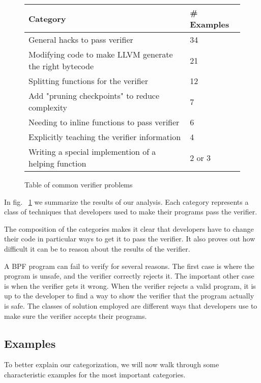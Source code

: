 \begin{figure}
    \centering
    \begin{tabular}{|p{5cm}|p{2cm}|}
        \hline
        Category & \# Examples \\
        \hline
        General hacks to pass verifier & 34 \\
        \hline
        Modifying code to make LLVM generate the right bytecode & 21 \\
        \hline
        Splitting functions for the verifier & 12 \\
        \hline
        Add "pruning checkpoints" to reduce complexity & 7 \\
        \hline
        Needing to inline functions to pass verifier & 6 \\
        \hline
        Explicitly teaching the verifier information & 4 \\
        \hline
        Writing a special implemention of a helping function & 2 or 3 \\
        \hline
    \end{tabular}
    \caption{Table of common verifier problems}
    \label{fig:commit-table}
\end{figure}

In fig. ~\ref{fig:commit-table} we summarize the results of our analysis.
Each category represents a class of techniques that developers used to make their programs pass the verifier.

The composition of the categories makes it clear that developers have to change their code in particular ways to get it to pass the verifier.
It also proves out how difficult it can be to reason about the results of the verifier.

A BPF program can fail to verify for several reasons.
The first case is where the program is unsafe, and the verifier correctly rejects it.
The important other case is when the verifier gets it wrong.
When the verifier rejects a valid program, it is up to the developer to find a way to show the verifier that the program actually is safe.
The classes of solution employed are different ways that developers use to make sure the verifier accepts their programs.

\subsection{Examples}
To better explain our categorization, we will now walk through some characteristic examples for the most important categories.

